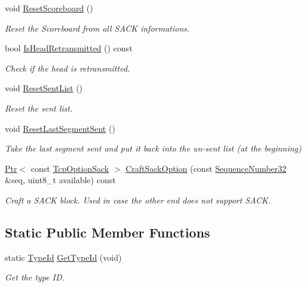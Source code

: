 \begin{DoxyCompactItemize}
void \hyperlink{classns3_1_1TcpTxBuffer_a6548f4b2cb53c40743988747229bd4ac}{Reset\+Scoreboard} ()
\begin{DoxyCompactList}\small\item\em Reset the Scoreboard from all S\+A\+CK informations. \end{DoxyCompactList}\item 
bool \hyperlink{classns3_1_1TcpTxBuffer_a547705cacaea905c9c3831225f17872b}{Is\+Head\+Retransmitted} () const 
\begin{DoxyCompactList}\small\item\em Check if the head is retransmitted. \end{DoxyCompactList}\item 
void \hyperlink{classns3_1_1TcpTxBuffer_acefebd565120f38dfaec17264443eef9}{Reset\+Sent\+List} ()
\begin{DoxyCompactList}\small\item\em Reset the sent list. \end{DoxyCompactList}\item 
void \hyperlink{classns3_1_1TcpTxBuffer_a61f519ff65cbadfb81099f866f1722f0}{Reset\+Last\+Segment\+Sent} ()
\begin{DoxyCompactList}\small\item\em Take the last segment sent and put it back into the un-\/sent list (at the beginning) \end{DoxyCompactList}\item 
\hyperlink{classns3_1_1Ptr}{Ptr}$<$ const \hyperlink{classns3_1_1TcpOptionSack}{Tcp\+Option\+Sack} $>$ \hyperlink{classns3_1_1TcpTxBuffer_af49d6395ebebed5e4ca8697e7331b79e}{Craft\+Sack\+Option} (const \hyperlink{group__network_gacb2070e4e98d2d5135c9bede58f07a03}{Sequence\+Number32} \&seq, uint8\+\_\+t available) const 
\begin{DoxyCompactList}\small\item\em Craft a S\+A\+CK block. Used in case the other end does not support S\+A\+CK. \end{DoxyCompactList}\end{DoxyCompactItemize}
\subsection*{Static Public Member Functions}
\begin{DoxyCompactItemize}
\item 
static \hyperlink{classns3_1_1TypeId}{Type\+Id} \hyperlink{classns3_1_1TcpTxBuffer_a0e303ee2cabca6bf9785ddac2a0fb392}{Get\+Type\+Id} (void)
\begin{DoxyCompactList}\small\item\em Get the type ID. \end{DoxyCompactList}\end{DoxyCompactItemize}
